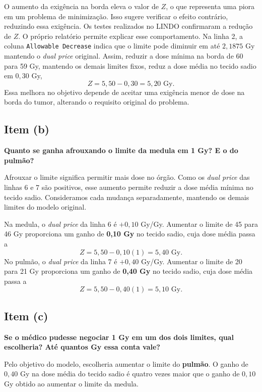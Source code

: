 \documentclass[12pt,a4paper]{article}
\begin{document}
O aumento da exigência na borda eleva o valor de $Z$, o que representa
uma piora em um problema de minimização. Isso sugere verificar o efeito
contrário, reduzindo essa exigência. Os testes realizados no LINDO
confirmaram a redução de $Z$. O próprio relatório permite explicar
esse comportamento. Na linha 2, a coluna \texttt{Allowable Decrease}
indica que o limite pode diminuir em até $2{,}1875$ Gy mantendo o
\textit{dual price} original. Assim, reduzir a dose mínima na borda de 60 para
59 Gy, mantendo os demais limites fixos, reduz a dose média no tecido
sadio em $0{,}30$ Gy,
\[
Z=5{,}50-0{,}30=5{,}20\text{ Gy}.
\]
Essa melhora no objetivo depende de aceitar uma exigência menor de
dose na borda do tumor, alterando o requisito original do problema.

\subsection*{Item (b)}

\textbf{Quanto se ganha afrouxando o limite da medula em 1 Gy?
E o do pulmão?}

Afrouxar o limite significa permitir mais dose no órgão. Como os \textit{dual price} das linhas 6 e 7 são positivos, esse aumento permite reduzir a
 dose média mínima no tecido sadio. Consideramos cada mudança
 separadamente, mantendo os demais limites do modelo original.

Na medula, o \textit{dual price} da linha 6 é $+0{,}10$ Gy/Gy. Aumentar o limite
 de 45 para 46 Gy proporciona um ganho de \textbf{0,10 Gy} no tecido sadio,
 cuja dose média passa a
\[
Z=5{,}50-0{,}10(1)=\boxed{5{,}40\text{ Gy}}.
\]
No pulmão, o \textit{dual price} da linha 7 é $+0{,}40$ Gy/Gy. Aumentar o limite
 de 20 para 21 Gy proporciona um ganho de \textbf{0,40 Gy} no tecido sadio,
 cuja dose média passa a
\[
Z=5{,}50-0{,}40(1)=\boxed{5{,}10\text{ Gy}}.
\]

\subsection*{Item (c)}

\textbf{Se o médico pudesse negociar 1 Gy em um dos dois limites,
qual escolheria? Até quantos Gy essa conta vale?}

Pelo objetivo do modelo, escolheria aumentar o limite do \textbf{pulmão}.
O ganho de $0{,}40$ Gy na dose média do tecido sadio é quatro vezes
maior que o ganho de $0{,}10$ Gy obtido ao aumentar o limite da medula.
\end{document}
